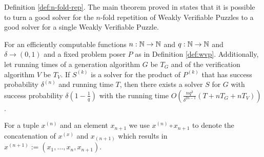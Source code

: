 \documentclass[11pt,a4paper,titlepage]{memoir}
\begin{document}
Definition \ref{def:n-fold-rep}.
%
The main theorem proved in \cite{canetti2004hardness} states that it is possible to turn a good solver for the $n$-fold repetition of
Weakly Verifiable Puzzles to a good solver for a single Weakly Verifiable Puzzle.
%
\begin{theorem}
  \label{th:wvp_chs}
For an efficiently computable functions $n:\mathbb{N} \rightarrow \mathbb{N}$ and $q: \mathbb{N} \rightarrow \mathbb{N}$ and $\delta \rightarrow (0,1)$
and a fixed problem poser $P$ as in Definition \ref{def:wvp}. Additionally, let running times of a generation algorithm $G$ be $T_G$
and of the verification algorithm $V$ be $T_V$. If $S^{(k)}$ is a solver for the product of $P^{(k)}$ that has success probability $\delta^{(n)}$
and running time $T$,  then there exists a solver $S$ for $G$ with success probability $\delta(1-\frac{1}{q})$ with the running time
$O(\frac{nq^3}{\delta^{2n-1}}(T + nT_G + nT_V))$.
\end{theorem}

For a tuple $x^{(n)}$ and an element $x_{n+1}$ we use $x^{(n)} \circ x_{n+1}$ to denote the concatenation of $x^{(x)}$ and $x_{(n+1)}$ which results in
$x^{(n+1)} := (x_1, \dotsc, x_n, x_{n+1})$.
\end{document}
